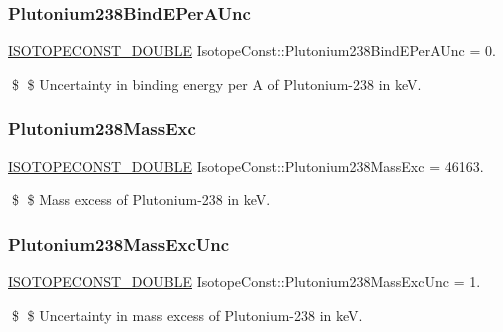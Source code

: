\subsubsection{\texorpdfstring{Plutonium238\+Bind\+E\+Per\+A\+Unc}{Plutonium238BindEPerAUnc}}
{\footnotesize\ttfamily \mbox{\hyperlink{group___isotope_const-_macros_ga8f45a7272ce02c0b4c65c44636ed719a}{I\+S\+O\+T\+O\+P\+E\+C\+O\+N\+S\+T\+\_\+\+D\+O\+U\+B\+LE}} Isotope\+Const\+::\+Plutonium238\+Bind\+E\+Per\+A\+Unc = 0.}

\$ \$ Uncertainty in binding energy per A of Plutonium-\/238 in keV. \mbox{\label{group___isotope_const-_plutonium-_pu238_ga06b5e3011885bae8b1fc07cb8c1fcb2b}} 
\subsubsection{\texorpdfstring{Plutonium238\+Mass\+Exc}{Plutonium238MassExc}}
{\footnotesize\ttfamily \mbox{\hyperlink{group___isotope_const-_macros_ga8f45a7272ce02c0b4c65c44636ed719a}{I\+S\+O\+T\+O\+P\+E\+C\+O\+N\+S\+T\+\_\+\+D\+O\+U\+B\+LE}} Isotope\+Const\+::\+Plutonium238\+Mass\+Exc = 46163.}

\$ \$ Mass excess of Plutonium-\/238 in keV. \mbox{\label{group___isotope_const-_plutonium-_pu238_ga89f40b327d0eeaa9a03ec8b6bcbc3948}} 
\subsubsection{\texorpdfstring{Plutonium238\+Mass\+Exc\+Unc}{Plutonium238MassExcUnc}}
{\footnotesize\ttfamily \mbox{\hyperlink{group___isotope_const-_macros_ga8f45a7272ce02c0b4c65c44636ed719a}{I\+S\+O\+T\+O\+P\+E\+C\+O\+N\+S\+T\+\_\+\+D\+O\+U\+B\+LE}} Isotope\+Const\+::\+Plutonium238\+Mass\+Exc\+Unc = 1.}

\$ \$ Uncertainty in mass excess of Plutonium-\/238 in keV. \mbox{\label{group___isotope_const-_plutonium-_pu238_ga09348adf3ecb6da12eaf1c5b5e226c2b}} 
